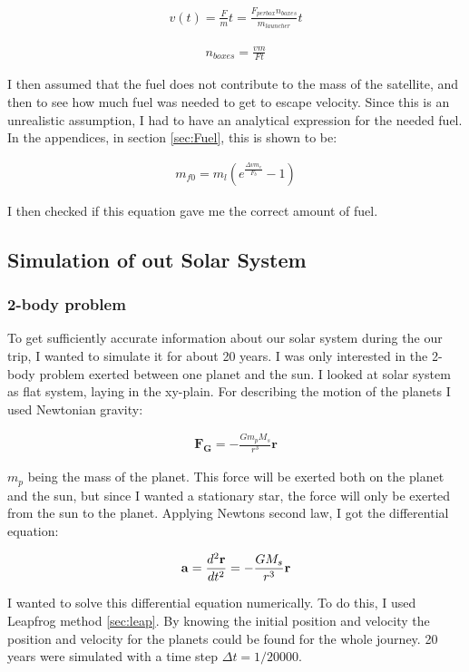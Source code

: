 \documentclass[a4paper, 10pt]{article}
\begin{document}
\begin{align}
v(t) = \frac{F}{m} t = \frac{F_{per box}n_{boxes}}{m_{launcher}} t
\end{align}

\begin{align}\label{eq:boxes}
n_{boxes} = \frac{v m}{F t}
\end{align}

I then assumed that the fuel does not contribute to the mass of the satellite, and then to see how much fuel was needed to get to escape velocity. Since this is an unrealistic assumption, I had to have an analytical expression for the needed fuel. In the appendices, in section \ref{sec:Fuel}, this is shown to be:

\begin{align}\label{eq:Fuel}
m_{f0} = m_l(e^{\frac{\Delta v m_e}{F_b}} - 1)
\end{align}

I then checked if this equation gave me the correct amount of fuel.

\subsection{Simulation of out Solar System}
\subsubsection{2-body problem}
To get sufficiently accurate information about our solar system during the our trip, I wanted to simulate it for about 20 years. I was only interested in the 2-body problem exerted between one planet and the sun. I looked at solar system as flat system, laying in the xy-plain. For describing the motion of the planets I used Newtonian gravity:

\begin{align}
\textbf{F}_\textbf{G} = -\frac{Gm_p M_s}{r^{3}}\textbf{r}
\end{align}

$m_p$ being the mass of the planet. This force will be exerted both on the planet and the sun, but since I wanted a stationary star, the force will only be exerted from the sun to the planet. Applying Newtons second law, I got the differential equation:

$$
\bold{a} = \frac{d^{2}\textbf{r}}{dt^{2}}  = -\frac{G M_s}{r^{3}}\textbf{r}
$$ 


I wanted to solve this differential equation numerically. To do this, I used Leapfrog method \ref{sec:leap}. By knowing the initial position and velocity the position and velocity for the planets could be found for the whole journey. 20 years were simulated with a time step $\Delta t = 1/20000.$\\
\end{document}
